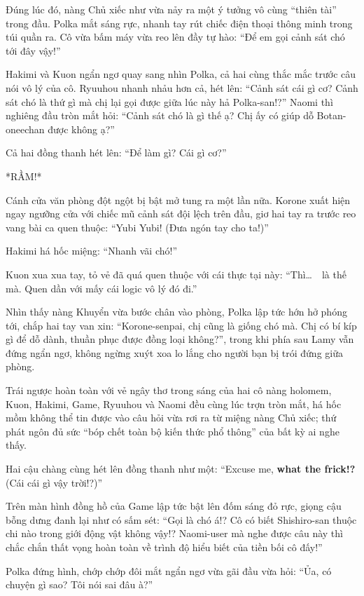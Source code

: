 \documentclass[../main.tex]{subfiles}
\begin{document}
Đúng lúc đó, nàng Chủ xiếc như vừa nảy ra một ý tưởng vô cùng ``thiên tài'' trong đầu. Polka mắt sáng rực, nhanh tay rút chiếc điện thoại thông minh trong túi quần ra. Cô vừa bấm máy vừa reo lên đầy tự hào: ``Để em gọi cảnh sát chó tới đây vậy!''

Hakimi và Kuon ngẩn ngơ quay sang nhìn Polka, cả hai cùng thắc mắc trước câu nói vô lý của cô. Ryuuhou nhanh nhảu hơn cả, hét lên: ``Cảnh sát cái gì cơ? Cảnh sát chó là thứ gì mà chị lại gọi được giữa lúc này hả Polka-san!?'' Naomi thì nghiêng đầu tròn mắt hỏi: ``Cảnh sát chó là gì thế ạ? Chị ấy có giúp dỗ Botan-oneechan được không ạ?''

Cả hai đồng thanh hét lên: ``Để làm gì? Cái gì cơ?''

*RẦM!*

Cánh cửa văn phòng đột ngột bị bật mở tung ra một lần nữa. Korone xuất hiện ngay ngưỡng cửa với chiếc mũ cảnh sát đội lệch trên đầu, giơ hai tay ra trước reo vang bài ca quen thuộc: ``Yubi Yubi! (Đưa ngón tay cho ta!)''


Hakimi há hốc miệng: ``Nhanh vãi chó!''

Kuon xua xua tay, tỏ vẻ đã quá quen thuộc với cái thực tại này: ``Thì\dots\ \hll\ là thế mà. Quen dần với mấy cái logic vô lý đó đi.''

Nhìn thấy nàng Khuyển vừa bước chân vào phòng, Polka lập tức hớn hở phóng tới, chắp hai tay van xin: ``Korone-senpai, chị cũng là giống chó mà. Chị có bí kíp gì để dỗ dành, thuần phục được đồng loại không?'', trong khi phía sau Lamy vẫn đứng ngẩn ngơ, không ngừng xuýt xoa lo lắng cho người bạn bị trói đứng giữa phòng.

Trái ngược hoàn toàn với vẻ ngây thơ trong sáng của hai cô nàng holomem, Kuon, Hakimi, Game, Ryuuhou và Naomi đều cùng lúc trợn tròn mắt, há hốc mồm không thể tin được vào câu hỏi vừa rơi ra từ miệng nàng Chủ xiếc; thứ phát ngôn đủ sức ``bóp chết toàn bộ kiến thức phổ thông'' của bất kỳ ai nghe thấy.

Hai cậu chàng cùng hét lên đồng thanh như một: ``Excuse me, \textbf{what the frick!?} (Cái cái gì vậy trời!?)''

Trên màn hình đồng hồ của Game lập tức bật lên đốm sáng đỏ rực, giọng cậu bỗng dưng đanh lại như có sấm sét: ``Gọi là chó á!? Cô có biết Shishiro-san thuộc chi nào trong giới động vật không vậy!? Naomi-user mà nghe được câu này thì chắc chắn thất vọng hoàn toàn về trình độ hiểu biết của tiền bối cô đấy!''

Polka đứng hình, chớp chớp đôi mắt ngẩn ngơ vừa gãi đầu vừa hỏi: ``Ủa, có chuyện gì sao? Tôi nói sai đâu à?''
\end{document}

